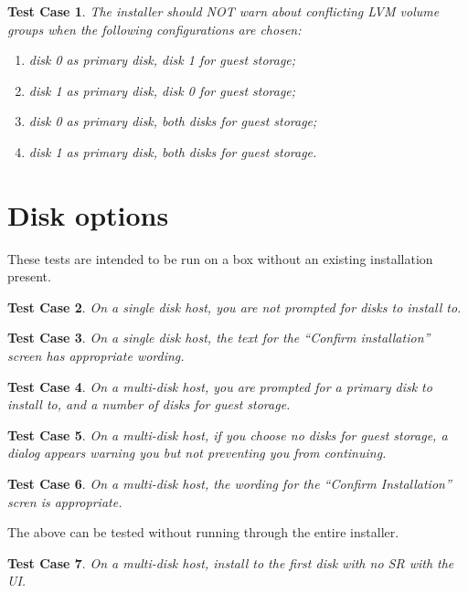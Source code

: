 \documentclass[a4paper]{article}
\newtheorem{testcase}{Test Case}
\begin{document}
\begin{testcase}
The installer should NOT warn about conflicting LVM volume groups when
the following configurations are chosen:
\begin{enumerate}
\item disk 0 as primary disk, disk 1 for guest storage;
\item disk 1 as primary disk, disk 0 for guest storage;
\item disk 0 as primary disk, both disks for guest storage;
\item disk 1 as primary disk, both disks for guest storage.
\end{enumerate}
\end{testcase}

\section{Disk options}

These tests are intended to be run on a box without an existing
installation present.

\begin{testcase}
On a single disk host, you are not prompted for disks to install to.
\end{testcase}

\begin{testcase}
On a single disk host, the text for the ``Confirm installation''
screen has appropriate wording.
\end{testcase}

\begin{testcase}
On a multi-disk host, you are prompted for a primary disk to install
to, and a number of disks for guest storage.
\end{testcase}

\begin{testcase}
On a multi-disk host, if you choose no disks for guest storage, a
dialog appears warning you but not preventing you from continuing.
\end{testcase}

\begin{testcase}
On a multi-disk host, the wording for the ``Confirm Installation''
scren is appropriate.
\end{testcase}

The above can be tested without running through the entire installer.

\begin{testcase}
On a multi-disk host, install to the first disk with no SR with the UI.
\end{testcase}
\end{document}
